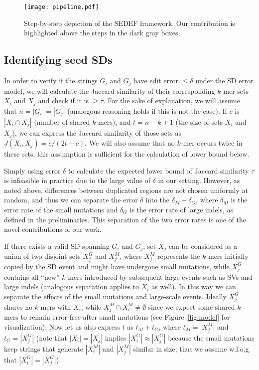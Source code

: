 \documentclass{article}
\begin{document}
\begin{figure*}
\centering
\texttt{[image: pipeline.pdf]}
\caption{Step-by-step depiction of the SEDEF framework. Our contribution is highlighted above the steps in the dark gray boxes.}
\label{fig:pipeline}
\end{figure*}

\subsection{Identifying seed SDs}

In order to  verify if the strings $G_i$ and $G_j$ have edit error $\leq \delta$ under the SD error model, 
 we will calculate the Jaccard similarity of their corresponding $k$-mer sets $X_i$ and $X_j$ and check if it is $\geq \tau$. 
For the sake of explanation, we will assume that $n=|G_i|=|G_j|$ (analogous reasoning holds if this is not the case).
If $c$ is $|X_i \cap X_j|$ (number of shared $k$-mers), and $t=n-k+1$ (the size of sets $X_i$ and $X_j$), we 
 can express the Jaccard similarity of those sets as $J(X_i,X_j)=c/(2t-c)$. We will also assume that no $k$-mer occurs twice in these sets; this assumption is sufficient for the calculation of lower bound below.

Simply using error $\delta$ to calculate the expected lower bound of Jaccard similarity $\tau$ is infeasible
 in practice due to the large value of $\delta$ in our setting.
However, as noted above, differences between duplicated regions are not chosen uniformly at random, and thus we can separate the error $\delta$ into the $\delta_M+\delta_G$, where $\delta_M$ is the error rate of the 
 small mutations and $\delta_G$ is the error rate of large indels, as defined in the preliminaries.
This separation of the two error rates is one of the novel contributions of our work.

If there exists a valid SD spanning $G_i$ and $G_j$, set $X_j$ can be considered as a union of two disjoint sets $X^G_j$ and $X^M_j$, where $X^M_j$ represents the $k$-mers initially copied by the SD event and might have undergone small mutations, while $X^G_j$ contains all ``new'' $k$-mers introduced by subsequent large events such as SVs and large indels
(analogous separation applies to $X_i$ as well). In this way we can separate the effects of the small mutations and large-scale events. Ideally $X^G_j$ shares no $k$-mers with $X_i$, while $X^M_j\cap X^M_i\neq\emptyset$ since we expect some shared $k$-mers to remain error-free after small mutations (see Figure~\ref{fig:model} for visualization). 
Now let us also express $t$ as $t_M+t_G$, where $t_M=|X^M_j|$ and $t_G=|X^G_j|$ (note that $|X_i|=|X_j|$ implies $|X^G_i|\approx|X^G_j|$ because the small mutations keep strings that generate $|X^M_i|$ and $|X^M_j|$ similar in size; thus we assume w.l.o.g that $|X^G_i|=|X^G_j|$).
\end{document}
